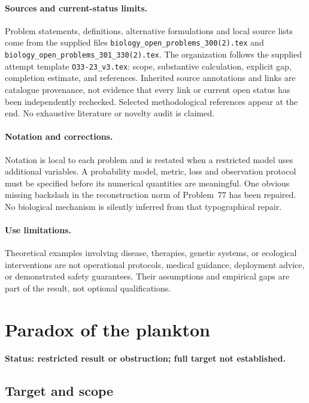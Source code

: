 \documentclass[11pt]{article}
\begin{document}
\paragraph{Sources and current-status limits.}
Problem statements, definitions, alternative formulations and local source lists
come from the supplied files
\texttt{biology\_open\_problems\_300(2).tex} and
\texttt{biology\_open\_problems\_301\_330(2).tex}.
The organization follows the supplied attempt template
\texttt{O33-23\_v3.tex}: scope, substantive calculation, explicit gap,
completion estimate, and references. Inherited source annotations and links are
catalogue provenance, not evidence that every link or current open status has
been independently rechecked. Selected methodological references appear at the
end. No exhaustive literature or novelty audit is claimed.

\paragraph{Notation and corrections.}
Notation is local to each problem and is restated when a restricted model uses
additional variables. A probability model, metric, loss and observation protocol
must be specified before its numerical quantities are meaningful. One obvious
missing backslash in the reconstruction norm of Problem~77 has been repaired.
No biological mechanism is silently inferred from that typographical repair.

\paragraph{Use limitations.}
Theoretical examples involving disease, therapies, genetic systems, or ecological
interventions are not operational protocols, medical guidance, deployment advice,
or demonstrated safety guarantees. Their assumptions and empirical gaps are part
of the result, not optional qualifications.


\section*{Paradox of the plankton}
\label{prob:190}
\noindent\textbf{Status: restricted result or obstruction; full target not established.}
\subsection{Target and scope}
\end{document}
